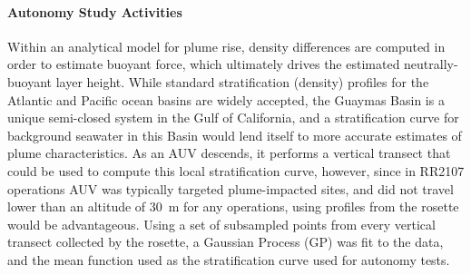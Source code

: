 \paragraph{Autonomy Study Activities}
Within an analytical model for plume rise, density differences are computed in order to estimate buoyant force, which ultimately drives the estimated neutrally-buoyant layer height.
While standard stratification (density) profiles for the Atlantic and Pacific ocean basins are widely accepted\autocite{speer1989model}, the Guaymas Basin is a unique semi-closed system in the Gulf of California, and a stratification curve for background seawater in this Basin would lend itself to more accurate estimates of plume characteristics. As an AUV descends, it performs a vertical transect that could be used to compute this local stratification curve, however, since in RR2107 operations AUV \Sentry was typically targeted plume-impacted sites, and did not travel lower than an altitude of \SI{30}{\meter} for any operations, using profiles from the rosette would be advantageous. Using a set of subsampled points from every vertical transect collected by the rosette, a Gaussian Process (GP) was fit to the data, and the mean function used as the stratification curve used for autonomy tests.

